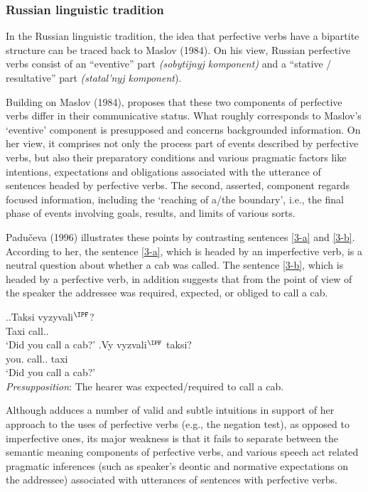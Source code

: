 \subsubsection{Russian linguistic tradition}
In the Russian linguistic tradition, the idea that perfective verbs have a bipartite structure can be traced back to Maslov (1984). On his view, Russian perfective verbs consist of an ``eventive'' part \textit{(sobytijnyj komponent)} and a ``stative / resultative'' part \textit{(statal'nyj komponent}).

Building on Maslov (1984), \citet{Paducheva:96, Paducheva:11} proposes that these two components of perfective verbs differ in their communicative status. What roughly corresponds to Maslov's `eventive' component is presupposed and concerns backgrounded information. On her view, it comprises not only the process part of events described by perfective verbs, but also their preparatory conditions and various pragmatic factors like intentions, expectations and obligations associated with the utterance of sentences headed by perfective verbs. The second, asserted, component regards focused information, including the `reaching of a/the boundary', i.e., the final phase of events involving goals, results, and limits of various sorts. 

Padu\v{c}eva (1996) illustrates these points by contrasting sentences \ref{3-a} and \ref{3-b}. According to her, the sentence \ref{3-a}, which is headed by an imperfective verb, is a neutral question about whether a cab was called. The sentence \ref{3-b}, which is headed by a perfective verb, in addition suggests that from the point of view of the speaker the addressee was required, expected, or obliged to call a cab. 

\ex.\label{3}\ag.\label{3-a}Taksi vyzyvali$^{\IPF}$?\\
Taxi call..\\
\trans `Did you call a cab?'
\bg.\label{3-b}Vy vyzvali$^{\IPF}$ taksi?\\
you. call.. taxi\\
\trans `Did you call a cab?'\\
\textit{Presupposition}: The hearer was expected/required to call a cab.\\

Although \citet{Paducheva:96} adduces a number of valid and subtle intuitions in support of her approach to the uses of perfective verbs (e.g., the negation test), as opposed to imperfective ones, its major weakness is that it fails to separate between the semantic meaning components of perfective verbs,  and various speech act related pragmatic inferences (such as speaker's deontic and normative expectations on the addressee) associated with utterances of sentences with perfective verbs. 
 
